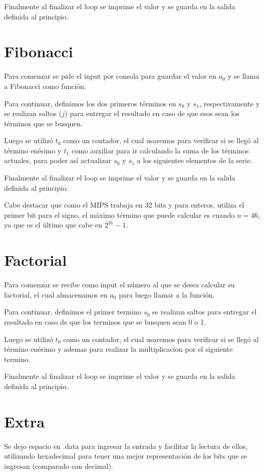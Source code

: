 \documentclass[11pt,letterpaper]{article}
\begin{document}
Finalmente al finalizar el loop se imprime el valor y se guarda en la salida definida al principio.


\section{Fibonacci}
Para comenzar se pide el input por consola para guardar el valor en $a_0$ y se llama a Fibonacci como función.

Para continuar, definimos los dos primeros términos en $s_0$ y $s_1$, respectivamente y se realizan saltos ($j$) para entregar el resultado en caso de que esos sean los términos que se busquen.

Luego se utilizó $t_0$ como un contador, el cual usaremos para verificar si se llegó al término enésimo y $t_1$ como auxiliar para ir calculando la suma de los términos actuales, para poder así actualizar $s_0$ y $s_1$ a los siguientes elementos de la serie.

Finalmente al finalizar el loop se imprime el valor y se guarda en la salida definida al principio.

Cabe destacar que como el MIPS trabaja en 32 bits y para enteros, utiliza el primer bit para el signo, el máximo término que puede calcular es cuando $n=46$, ya que es el último que cabe en $2^{31}-1$.

\section{Factorial}
Para comenzar se recibe como input el número al que se desea calcular su factorial, el cual almacenamos en $a_0$ para luego llamar a la función. 

Para continuar, definimos el primer termino  $s_0$ se realizan saltos para entregar el resultado en caso de que los terminos que se busquen sean 0 o 1.

Luego se utilizó $t_0$ como un contador, el cual usaremos para verificar si se llegó al término enésimo y ademas para realizar la multiplicacion por el siguiente termino.

Finalmente al finalizar el loop se imprime el valor y se guarda en la salida definida al principio.



\section{Extra}
Se dejo espacio en .data para ingresar la entrada y facilitar la lectura de ellos, utilizando hexadecimal para tener una mejor representación de los bits que se ingresan (comparado con decimal). 
\end{document}
